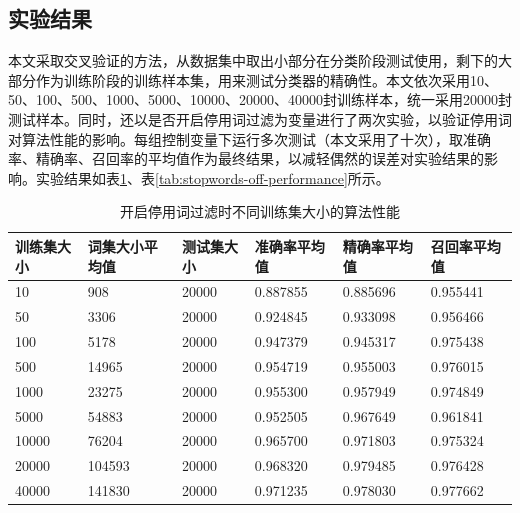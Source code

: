 \documentclass[UTF8,zihao=-4]{ctexart}
\begin{document}
\subsection{实验结果}	
	本文采取交叉验证的方法，从数据集中取出小部分在分类阶段测试使用，剩下的大部分作为训练阶段的训练样本集，用来测试分类器的精确性。本文依次采用10、50、100、500、1000、5000、10000、20000、40000封训练样本，统一采用20000封测试样本。同时，还以是否开启停用词过滤为变量进行了两次实验，以验证停用词对算法性能的影响。每组控制变量下运行多次测试（本文采用了十次），取准确率、精确率、召回率的平均值作为最终结果，以减轻偶然的误差对实验结果的影响。实验结果如表\ref{tab:stopwords-on-performance}、表\ref{tab:stopwords-off-performance}所示。
	
	\begin{table}[H]
		\centering
		\caption{开启停用词过滤时不同训练集大小的算法性能}
		\label{tab:stopwords-on-performance}
		\begin{tabular}{llllll}
			\toprule
			训练集大小&词集大小平均值&测试集大小&准确率平均值&精确率平均值&召回率平均值\\
			\midrule
			10&908&20000&0.887855&0.885696&0.955441\\
			50&3306&20000&0.924845&0.933098&0.956466\\
			100&5178&20000&0.947379&0.945317&0.975438\\
			500&14965&20000&0.954719&0.955003&0.976015\\
			1000&23275&20000&0.955300&0.957949&0.974849\\
			5000&54883&20000&0.952505&0.967649&0.961841\\
			10000&76204&20000&0.965700&0.971803&0.975324\\
			20000&104593&20000&0.968320&0.979485&0.976428\\
			40000&141830&20000&0.971235&0.978030&0.977662\\
			\bottomrule
		\end{tabular}
	\end{table}
\end{document}
